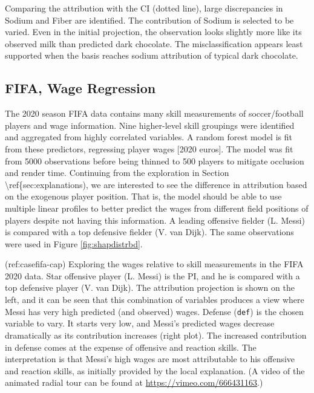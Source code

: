 \documentclass[
]{jss}
\begin{document}
Comparing the attribution with the CI (dotted line), large discrepancies in Sodium and Fiber are identified. The contribution of Sodium is selected to be varied. Even in the initial projection, the observation looks slightly more like its observed milk than predicted dark chocolate. The misclassification appears least supported when the basis reaches sodium attribution of typical dark chocolate.

\hypertarget{fifa-wage-regression}{%
\subsection{FIFA, Wage Regression}\label{fifa-wage-regression}}

The 2020 season FIFA data \citep{leone_fifa_2020, biecek_dalex_2018} contains many skill measurements of soccer/football players and wage information. Nine higher-level skill groupings were identified and aggregated from highly correlated variables. A random forest model is fit from these predictors, regressing player wages {[}2020 euros{]}. The model was fit from 5000 observations before being thinned to 500 players to mitigate occlusion and render time. Continuing from the exploration in Section \textbackslash ref\{sec:explanations), we are interested to see the difference in attribution based on the exogenous player position. That is, the model should be able to use multiple linear profiles to better predict the wages from different field positions of players despite not having this information. A leading offensive fielder (L. Messi) is compared with a top defensive fielder (V. van Dijk). The same observations were used in Figure \ref{fig:shapdistrbd}.

(ref:casefifa-cap) Exploring the wages relative to skill measurements in the FIFA 2020 data. Star offensive player (L. Messi) is the PI, and he is compared with a top defensive player (V. van Dijk). The attribution projection is shown on the left, and it can be seen that this combination of variables produces a view where Messi has very high predicted (and observed) wages. Defense (\texttt{def}) is the chosen variable to vary. It starts very low, and Messi's predicted wages decrease dramatically as its contribution increases (right plot). The increased contribution in defense comes at the expense of offensive and reaction skills. The interpretation is that Messi's high wages are most attributable to his offensive and reaction skills, as initially provided by the local explanation. (A video of the animated radial tour can be found at \url{https://vimeo.com/666431163}.)
\end{document}

